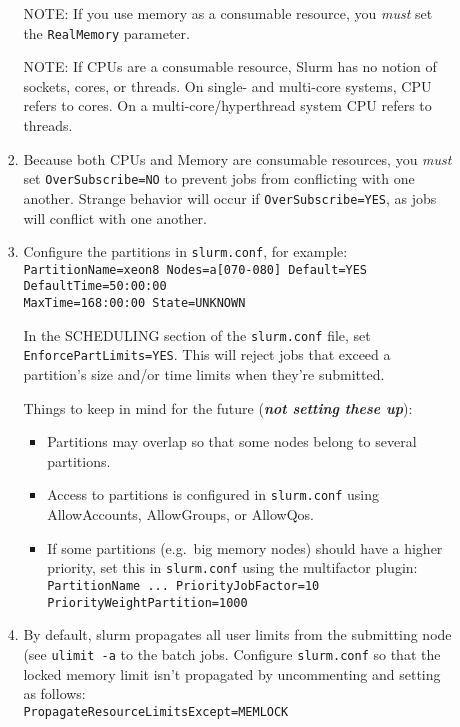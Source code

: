 \begin{enumerate}
\begin{enumerate}
\begin{enumerate}
		NOTE: If you use memory as a consumable resource, you \emph{must} set the \texttt{RealMemory} parameter.
	
		NOTE: If CPUs are a consumable resource, Slurm has no notion of sockets, cores, or threads. On single- and multi-core systems, CPU refers to cores. On a multi-core/hyperthread system CPU refers to threads.
	
		\item Because both CPUs and Memory are consumable resources, you \emph{must} set \texttt{OverSubscribe=NO} to prevent jobs from conflicting with one another. Strange behavior will occur if \texttt{OverSubscribe=YES}, as jobs will conflict with one another. %

		\item Configure the partitions in \texttt{slurm.conf}, for example: \\
		\texttt{PartitionName=xeon8 Nodes=a[070-080] Default=YES DefaultTime=50:00:00 \\ MaxTime=168:00:00 State=UNKNOWN}

		In the SCHEDULING section of the \texttt{slurm.conf} file, set \texttt{EnforcePartLimits=YES}. This will reject jobs that exceed a partition's size and/or time limits when they're submitted.

		Things to keep in mind for the future (\emph{\textbf{not setting these up}}):
			\begin{itemize}
			\item Partitions may overlap so that some nodes belong to several partitions. 
	
			\item Access to partitions is configured in \texttt{slurm.conf} using AllowAccounts, AllowGroups, or AllowQos.
	
			\item If some partitions (e.g.\ big memory nodes) should have a higher priority, set this in \texttt{slurm.conf} using the multifactor plugin:
			\texttt{PartitionName ... PriorityJobFactor=10} \\
			\texttt{PriorityWeightPartition=1000}
			\end{itemize}

		\item By default, slurm propagates all user limits from the submitting node (see \texttt{ulimit -a} to the batch jobs. Configure \texttt{slurm.conf} so that the locked memory limit isn't propagated by uncommenting and setting as follows: \\
		\texttt{PropagateResourceLimitsExcept=MEMLOCK}
	

\end{enumerate}
\end{enumerate}
\end{enumerate}
